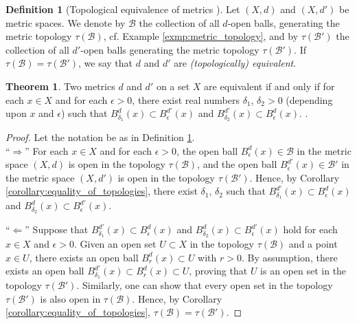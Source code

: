 \documentclass[12pt, a4paper]{article}
\numberwithin{equation}{section}
\theoremstyle{definition}
\theoremstyle{definition}
\newtheorem{defn}[thm]{Definition} %
\newtheorem{theorem}[thm]{Theorem}
\begin{document}
		\begin{defn}[Topological equivalence of metrics \cite{topology-singh}]\label{defn:topological_equivalence_metrics}
			Let $(X, d)$ and $(X, d')$ be metric spaces. We denote by $\mathscr B$ the collection of all $d$-open balls, generating the metric topology $\tau(\mathscr B)$, cf. Example \ref{exmp:metric_topology}, and by $\tau(\mathscr B')$ the collection of all $d'$-open balls generating the metric topology $\tau(\mathscr B')$. If $\tau(\mathscr B) = \tau(\mathscr B')$, we say that $d$ and $d'$ are \textit{(topologically) equivalent}.
		\end{defn}
	
		\begin{theorem}\label{thrm:topological_equivalence}
			Two metrics $d$ and $d'$ on a set $X$ are equivalent if and only if for each $x\in X$ and for each $\epsilon > 0$, there exist real numbers $\delta_1$, $\delta_2 > 0$ (depending upon $x$ and $\epsilon$) such that $B^{d}_{\delta_1}(x) \subset B^{d'}_{\epsilon}(x)$ and $B^{d'}_{\delta_2}(x) \subset B^{d}_{\epsilon}(x)$. \cite{topology-singh}.
		\end{theorem}
		
		\begin{proof}
			Let the notation be as in Definition \ref{defn:topological_equivalence_metrics}.
			\\
			
			\enquote{$\Longrightarrow$} For each $x\in X$ and for each $\epsilon > 0$, the open ball $B^{d}_{\epsilon}(x)\in\mathscr B$ in the metric space $(X, d)$ is open in the topology $\tau(\mathscr B)$, and the open ball $B^{d'}_{\epsilon}(x)\in\mathscr B'$ in the metric space $(X, d')$ is open in the topology $\tau(\mathscr B')$. Hence, by Corollary \ref{corollary:equality_of_topologies}, there exist $\delta_1$, $\delta_2$ such that $B^{d'}_{\delta_1}(x) \subset B^{d}_{\epsilon}(x)$ and $B^{d}_{\delta_2}(x) \subset B^{d'}_{\epsilon}(x)$.
			
			\enquote{$\Longleftarrow$} Suppose that $B^{d'}_{\delta_1}(x) \subset B^{d}_{\epsilon}(x)$ and $B^{d}_{\delta_2}(x) \subset B^{d'}_{\epsilon}(x)$ hold for each $x\in X$ and $\epsilon > 0$. Given an open set $U\subset X$ in the topology $\tau(\mathscr B)$ and a point $x\in U$, there exists an open ball $B^{d}_{r}(x) \subset U$ with $r > 0$. By assumption, there exists an open ball $B^{d'}_{\delta_1}(x) \subset B^{d}_{r}(x) \subset U$, proving that $U$ is an open set in the topology $\tau(\mathscr B')$. Similarly, one can show that every open set in the topology $\tau(\mathscr B')$ is also open in $\tau(\mathscr B)$. Hence, by Corollary \ref{corollary:equality_of_topologies}, $\tau(\mathscr B) = \tau(\mathscr B')$.
		\end{proof}
		
\end{document}
